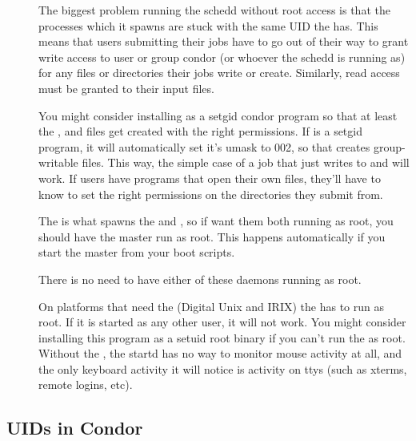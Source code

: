 \begin{description}
\item[] The biggest problem running the schedd
    without root access is that the  processes which it
    spawns are stuck with the same UID the  has.  This
    means that users submitting their jobs have to go out of their way
    to grant write access to user or group condor (or whoever the
    schedd is running as) for any files or directories their jobs
    write or create.  Similarly, read access must be granted to their
    input files.

    You might consider installing  as a setgid condor
    program so that at least the ,  and
     files get created with the right permissions.  If
     is a setgid program, it will automatically set
    it's umask to 002, so that creates group-writable files.  This
    way, the simple case of a job that just writes to 
    and  will work.  If users have programs that open
    their own files, they'll have to know to set the right permissions
    on the directories they submit from.

\item[] The  is what spawns the
     and , so if want them both running
    as root, you should have the master run as root.  This happens
    automatically if you start the master from your boot scripts.

\item[]
\item[] There is no need to have either of these
daemons running as root.

\item[] On platforms that need the  (Digital
    Unix and IRIX) the  has to run as root.  If it is
    started as any other user, it will not work.  You might consider
    installing this program as a setuid root binary if you can't run
    the  as root.  Without the , the
    startd has no way to monitor mouse activity at all, and the only
    keyboard activity it will notice is activity on ttys (such as
    xterms, remote logins, etc).

\end{description}

\subsection{\label{sec:uids}UIDs in Condor}
\Todo

